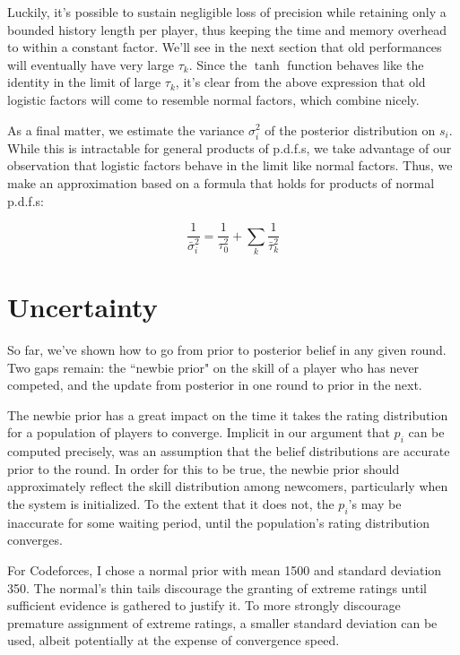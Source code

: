\documentclass{article}
\begin{document}
Luckily, it's possible to sustain negligible loss of precision while retaining only a bounded history length per player, thus keeping the time and memory overhead to within a constant factor. We'll see in the next section that old performances will eventually have very large $\tau_k$. Since the $\tanh$ function behaves like the identity in the limit of large $\tau_k$, it's clear from the above expression that old logistic factors will come to resemble normal factors, which combine nicely.

As a final matter, we estimate the variance $\sigma_i^2$ of the posterior distribution on $s_i$. While this is intractable for general products of p.d.f.s, we take advantage of our observation that logistic factors behave in the limit like normal factors. Thus, we make an approximation based on a formula that holds for products of normal p.d.f.s:

\[\frac{1}{\bar\sigma_i^2} = \frac{1}{\tau_0^2} + \sum_k \frac{1}{\bar\tau_k^2}\]

\section{Uncertainty}

So far, we've shown how to go from prior to posterior belief in any given round. Two gaps remain: the ``newbie prior" on the skill of a player who has never competed, and the update from posterior in one round to prior in the next.

The newbie prior has a great impact on the time it takes the rating distribution for a population of players to converge. Implicit in our argument that $p_i$ can be computed precisely, was an assumption that the belief distributions are accurate prior to the round. In order for this to be true, the newbie prior should approximately reflect the skill distribution among newcomers, particularly when the system is initialized. To the extent that it does not, the $p_i$'s may be inaccurate for some waiting period, until the population's rating distribution converges.

For Codeforces, I chose a normal prior with mean 1500 and standard deviation 350. The normal's thin tails discourage the granting of extreme ratings until sufficient evidence is gathered to justify it. To more strongly discourage premature assignment of extreme ratings, a smaller standard deviation can be used, albeit potentially at the expense of convergence speed.
\end{document}
